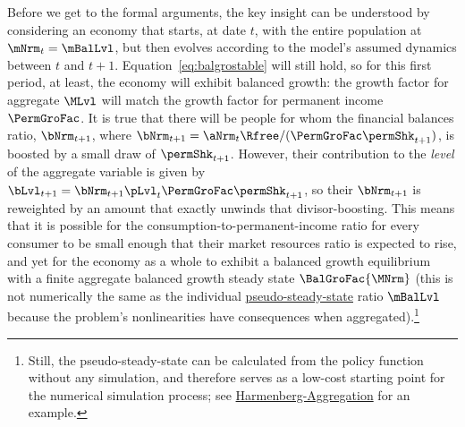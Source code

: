 \documentclass[BufferStockTheory]{subfiles}
\begin{document}
Before we get to the formal arguments, the key insight can be understood by considering an economy that starts, at date $t$, with the entire population at $\mNrm_{t}=\mBalLvl$, but then evolves according to the model's assumed dynamics between $t$ and $t+1$.
Equation~\eqref{eq:balgrostable} will still hold, so for this first period, at least, the economy will exhibit balanced growth: the growth factor for aggregate $\MLvl$ will match the growth factor for permanent income $\PermGroFac$.
It is true that there will be people for whom the financial balances ratio, $\bNrm_{t+1}$, where $\bNrm_{t+1} = \aNrm_{t}\Rfree/(\PermGroFac\permShk_{t+1})$, is boosted by a small draw of $\permShk_{t+1}$.
However, their contribution to the \textit{level} of the aggregate variable is given by $\bLvl_{t+1}=\bNrm_{t+1}\pLvl_{t}\PermGroFac\permShk_{t+1}$, so their $\bNrm_{t+1}$ is reweighted by an amount that exactly unwinds that divisor-boosting.
This means that it is possible for the consumption-to-permanent-income ratio for every consumer to be small enough that their market resources ratio is expected to rise, and yet for the economy as a whole to exhibit a balanced growth equilibrium with a finite aggregate balanced growth steady state $\BalGroFac{\MNrm}$ (this is not numerically the same as the individual \hyperlink{pseudo-steady-state}{pseudo-steady-state} ratio $\mBalLvl$ because the problem's nonlinearities have consequences when aggregated).\footnote{Still, the pseudo-steady-state can be calculated from the policy function without any simulation, and therefore serves as a low-cost starting point for the numerical simulation process; see \href{https://econ-ark.org/materials/harmenberg-aggregation?launch}{Harmenberg-Aggregation} for an example.}
\end{document}
